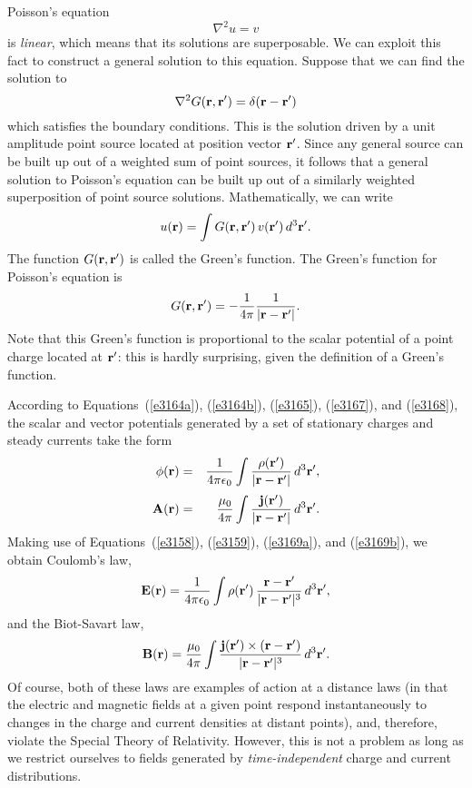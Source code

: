 Poisson's equation
\begin{equation}
\nabla^2 u = v\label{e3165}
\end{equation}
is {\em linear}, which means that its solutions are superposable. We can exploit
this fact to construct a general solution to this equation. Suppose that we can
find the solution to
\begin{equation}
\nabla^2 G({\bf r}, {\bf r}') = \delta({\bf r} - {\bf r}')
\end{equation}
which satisfies the boundary conditions. 
This is the solution driven by  a unit amplitude point source located at position
vector ${\bf r}'$. Since any general source can be built up out of a weighted sum
of point sources, it follows that a general solution to Poisson's equation 
can be built up out of a similarly weighted superposition of point source solutions. 
Mathematically, we can write
\begin{equation}\label{e3167}
u({\bf r}) = \int G({\bf r}, {\bf r}')\, v({\bf r}')\,d^3{\bf r}'.
\end{equation}
The function $G({\bf r}, {\bf r}')$ is called the Green's function. The Green's function
for Poisson's equation is
\begin{equation}\label{e3168}
G({\bf r}, {\bf r}') = - \frac{1}{4\pi} \frac{1}{|{\bf r} - {\bf r}'|}.
\end{equation}
Note that this  Green's function is proportional to the scalar potential of
a point charge located at ${\bf r}'$: this is hardly surprising, given the
definition of a Green's function. 

According to Equations~(\ref{e3164a}), (\ref{e3164b}), (\ref{e3165}), (\ref{e3167}), and (\ref{e3168}), the 
scalar and vector potentials generated by
a set of stationary charges and steady currents take the form
\begin{eqnarray}
\phi({\bf r}) &=& \frac{1}{4\pi\epsilon_0} \int \frac{\rho({\bf r}')}
{|{\bf r} - {\bf r}'|} \,d^3{\bf r}',\label{e3169a}\\[0.5ex]
{\bf A}({\bf r}) &=& \frac{\mu_0}{4\pi} \int \frac{{\bf j}({\bf r}')}
{|{\bf r} - {\bf r}'|} \,d^3{\bf r}'.\label{e3169b}
\end{eqnarray}
Making use of Equations~(\ref{e3158}), (\ref{e3159}), (\ref{e3169a}), and (\ref{e3169b}), we obtain Coulomb's law,
\begin{equation}\label{e2.216x}
{\bf E}({\bf r}) = \frac{1}{4\pi\epsilon_0} \int \rho({\bf r}') \,\frac{{\bf r} 
-{\bf r}'}{|{\bf r} - {\bf r}'|^3}\,d^3{\bf r}',
\end{equation}
and the Biot-Savart law,
\begin{equation}
{\bf B} ({\bf r}) = \frac{\mu_0}{4\pi} \int \frac{{\bf j}({\bf r}')\times
({\bf r} - {\bf r}')}
{|{\bf r} - {\bf r}'|^3}\,d^3{\bf r}'.\label{e3171}
\end{equation}
Of course, both of these laws are examples of action at a distance laws (in that the electric and magnetic fields at a given point respond instantaneously to
changes in the charge and current densities at distant points), and,
therefore, violate the Special Theory of Relativity. However,  this is not a problem as long as we
restrict ourselves to fields generated by
{\em time-independent}\/ charge and current distributions. 

